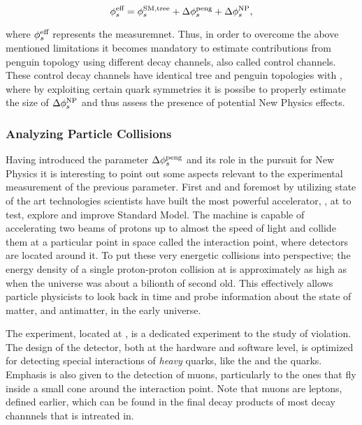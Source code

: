 \begin{equation}
\centering
 \phis^{\text {eff}} = \phis^{\tiny \text{SM,tree}} + \Delta\phiS{peng} + \Delta\phis^{\tiny \text{NP}},
 \label{app_phis_sm_peng}
\end{equation}

\noindent where $\phi_{s}^{\text {eff}}$ represents the \phis measuremnet.
Thus, in order to overcome the above mentioned limitations it becomes mandatory to estimate
contributions from penguin topology using different decay channels, also called control channels.
These control decay channels have identical tree and penguin topologies with \BsJpsiPhi, where
by exploiting certain quark symmetries it is possibe to properly estimate the size of
$\Delta\phi_{s}^{\tiny \text{NP}}$ and thus assess the presence of potential New Physics effects.

\subsubsection{Analyzing Particle Collisions}
Having introduced the parameter $\Delta\phi_{s}^{\tiny\text{peng}}$ and its role in the pursuit for New Physics
it is interesting to point out some aspects relevant to the experimental measurement of the previous parameter.
First and and foremost by utilizing state of the art technologies scientists have built the most
powerful accelerator, \lhc, at \cern to test, explore and improve Standard Model. The machine is
capable of accelerating two beams of protons up to almost the speed of light and collide them at
a particular point in space called the interaction point, where detectors are located around it.
To put these very energetic collisions into perspective; the energy density of a single proton-proton
collision at \lhc is approximately as high as when the universe was about a bilionth of second old.
This effectively allows particle physicists to look back in time and probe information about the
state of matter, and antimatter, in the early universe.

The \lhcb experiment, located at \cern, is a dedicated experiment to the study of \CP violation.
The design of the detector, both at the hardware and software level, is optimized for detecting
special interactions of {\it heavy} quarks, like the \bquark and the \cquark quarks.
Emphasis is also given to the detection of muons, particularly to the ones that fly
inside a small cone around the interaction point. Note that muons are leptons, defined earlier,
which can be found in the final decay products of most decay channnels that \lhcb is intreated in.

